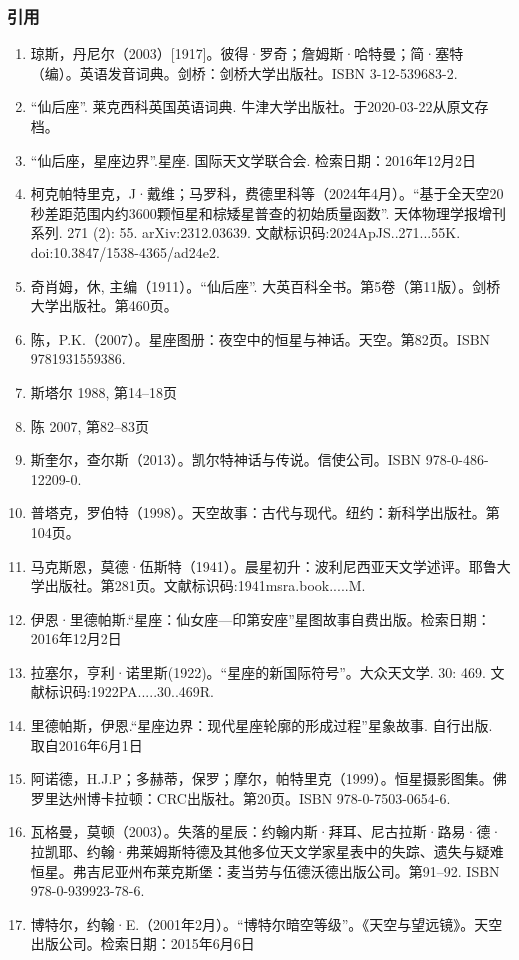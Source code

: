 \subsubsection{引用}
\begin{enumerate}
\item 琼斯，丹尼尔（2003）[1917]。彼得·罗奇；詹姆斯·哈特曼；简·塞特（编）。英语发音词典。剑桥：剑桥大学出版社。ISBN 3-12-539683-2.
\item “仙后座”. 莱克西科英国英语词典. 牛津大学出版社。于2020-03-22从原文存档。
\item “仙后座，星座边界”.星座. 国际天文学联合会. 检索日期：2016年12月2日
\item 柯克帕特里克，J·戴维；马罗科，费德里科等（2024年4月）。“基于全天空20秒差距范围内约3600颗恒星和棕矮星普查的初始质量函数”. 天体物理学报增刊系列. 271 (2): 55. arXiv:2312.03639. 文献标识码:2024ApJS..271...55K. doi:10.3847/1538-4365/ad24e2.
\item 奇肖姆，休, 主编（1911）。“仙后座”. 大英百科全书。第5卷（第11版）。剑桥大学出版社。第460页。
\item 陈，P.K.（2007）。星座图册：夜空中的恒星与神话。天空。第82页。ISBN 9781931559386.
\item 斯塔尔 1988, 第14–18页
\item 陈 2007, 第82–83页
\item 斯奎尔，查尔斯（2013）。凯尔特神话与传说。信使公司。ISBN 978-0-486-12209-0.
\item 普塔克，罗伯特（1998）。天空故事：古代与现代。纽约：新科学出版社。第104页。
\item 马克斯恩，莫德·伍斯特（1941）。晨星初升：波利尼西亚天文学述评。耶鲁大学出版社。第281页。文献标识码:1941msra.book.....M.
\item 伊恩·里德帕斯.“星座：仙女座—印第安座”星图故事自费出版。检索日期：2016年12月2日
\item 拉塞尔，亨利·诺里斯(1922)。“星座的新国际符号”。大众天文学. 30: 469. 文献标识码:1922PA.....30..469R.
\item 里德帕斯，伊恩.“星座边界：现代星座轮廓的形成过程”星象故事. 自行出版. 取自2016年6月1日
\item 阿诺德，H.J.P；多赫蒂，保罗；摩尔，帕特里克（1999）。恒星摄影图集。佛罗里达州博卡拉顿：CRC出版社。第20页。ISBN 978-0-7503-0654-6.
\item 瓦格曼，莫顿（2003）。失落的星辰：约翰内斯·拜耳、尼古拉斯·路易·德·拉凯耶、约翰·弗莱姆斯特德及其他多位天文学家星表中的失踪、遗失与疑难恒星。弗吉尼亚州布莱克斯堡：麦当劳与伍德沃德出版公司。第91–92. ISBN 978-0-939923-78-6.
\item 博特尔，约翰·E.（2001年2月）。“博特尔暗空等级”。《天空与望远镜》。天空出版公司。检索日期：2015年6月6日

\end{enumerate}
